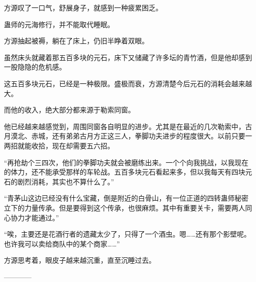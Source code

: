 \begin{this_body}
方源叹了一口气，舒展身子，就感到一种疲累困乏。

蛊师的元海修行，并不能取代睡眠。

方源抽起被褥，躺在了床上，仍旧半睁着双眼。

虽然床头就藏着那五百多块的元石，床下又储藏了许多坛的青竹酒，但是他却感到一股隐隐的危机感。

这五百多块元石，已经是一种极限。盛极而衰，方源清楚今后元石的消耗会越来越大。

而他的收入，绝大部分都来源于勒索同窗。

他已经越来越感觉到，周围同窗各自明显的进步。尤其是在最近的几次勒索中，古月漠北、赤城，还有弟弟古月方正这三人，拳脚功夫进步的程度很大。以前只要一两招就能收拾，现在却需要五六招。

“再抢劫个三四次，他们的拳脚功夫就会被磨练出来。一个个向我挑战，以我现在的体力，还不能承受那样的车轮战。五百多块元石看起来多，但以我每天有四块元石的剧烈消耗，其实也不算什么了。”

“青茅山这边已经没有什么宝藏，倒是附近的白骨山，有一位正道的四转蛊师秘密立下的力量传承。但是要得到这个传承，也很麻烦。其中有重要关卡，需要两人同心协力才能通过。”

“唉，主要还是花酒行者的遗藏太少了，只得了一个酒虫。嗯……还有那个影壁呢。也许我可以卖给商队中的某个商家……”

方源思考着，眼皮子越来越沉重，直至沉睡过去。

------------

\end{this_body}

